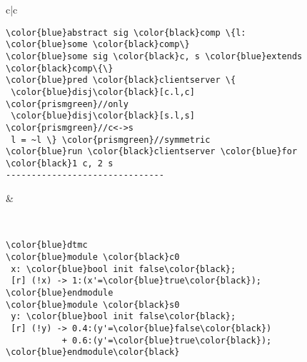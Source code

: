 
\begin{figure}
\bgroup
\def\arraystretch{0.8}
\begin{tabular}{c|c}
\begin{minipage}{0.51\linewidth}
{\scriptsize
\begin{Verbatim}[commandchars=\\\{\},codes={\catcode`$=3\catcode`^=7\catcode`_=8}]
\color{blue}abstract sig \color{black}comp \{l: \color{blue}some \color{black}comp\}
\color{blue}some sig \color{black}c, s \color{blue}extends \color{black}comp\{\}
\color{blue}pred \color{black}clientserver \{ 
 \color{blue}disj\color{black}[c.l,c] \color{prismgreen}//only
 \color{blue}disj\color{black}[s.l,s] \color{prismgreen}//c<->s
 l = ~l \} \color{prismgreen}//symmetric
\color{blue}run \color{black}clientserver \color{blue}for \color{black}1 c, 2 s
-------------------------------
\end{Verbatim}
}
\end{minipage}


& 
  
 \begin{minipage}{0.49\linewidth}
\end{minipage}
\\
\begin{minipage}{0.51\linewidth}
\vspace{0.05cm}
{\scriptsize
\begin{Verbatim}[commandchars=\\\{\},codes={\catcode`$=3\catcode`^=7\catcode`_=8}]
\color{blue}dtmc
\color{blue}module \color{black}c0
 x: \color{blue}bool init false\color{black};
 [r] (!x) -> 1:(x'=\color{blue}true\color{black});
\color{blue}endmodule
\color{blue}module \color{black}s0
 y: \color{blue}bool init false\color{black};
 [r] (!y) -> 0.4:(y'=\color{blue}false\color{black}) 
           + 0.6:(y'=\color{blue}true\color{black});
\color{blue}endmodule\color{black}
\end{Verbatim}
}
\end{minipage}


\end{tabular}
\end{figure}
